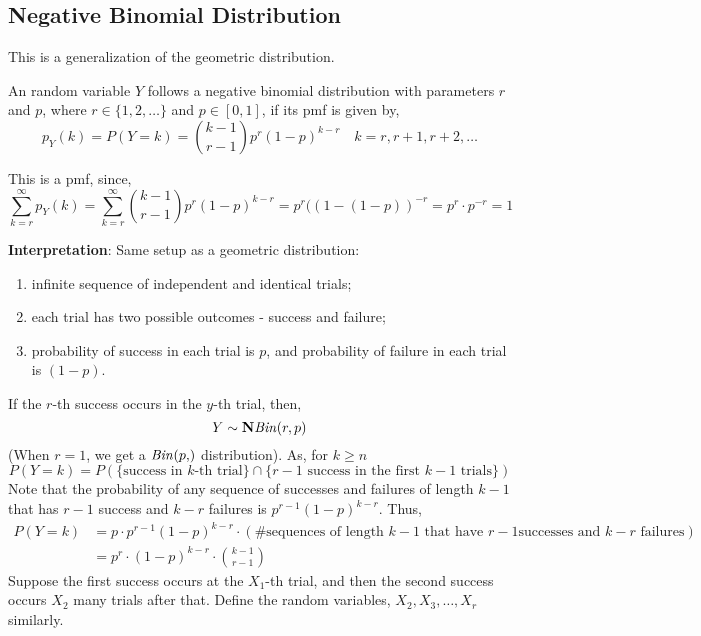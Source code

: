 \subsection{Negative Binomial Distribution}
This is a generalization of the geometric distribution. 
\begin{definition}
    An random variable $Y$ follows a negative binomial distribution with
parameters $r$ and $p$, where $r \in \lbrace 1, 2, \dots \rbrace$ and $p
\in [0, 1]$, if its pmf is given by, 
\[ p_Y(k) = P(Y = k) = {{k - 1} \choose {r - 1}} p^r (1 - p)^{k - r}
   \quad k = r, r+1, r+2, \dots                                              \]
\end{definition}
This is a pmf, since, 
\[   \sum_{k = r}^\infty p_Y(k) 
   = \sum_{k = r}^\infty {{k - 1} \choose {r - 1}} p^r (1 - p)^{k - r}  
   = p^r ((1 - (1 - p))^{-r}
   = p^r \cdot p^{-r}
   = 1                                                                       \]

\noindent
\textbf{Interpretation}: Same setup as a geometric distribution:
\begin{enumerate}[noitemsep, topsep=0em]
    \item infinite sequence of independent and identical trials;
    \item each trial has two possible outcomes - success and failure;
    \item probability of success in each trial is $p$, and probability of
          failure in each trial is $(1 - p)$. 
\end{enumerate}
If the $r$-th success occurs in the $y$-th trial, then,
\[ Y \sim \text{$\mathbf{N}$\emph{Bin}}(r, p) \]
(When $r = 1$, we get a $\binomialdist{p}$ distribution). As, for $k \geq n$
\[
    P(Y = k) = P(\lbrace \text{success in $k$-th trial} \rbrace \cap
                 \lbrace \text{$r-1$ success in the first $k-1$ trials}\rbrace)
\]
Note that the probability of any sequence of successes and failures of length
$k - 1$ that has $r - 1$ success and $k - r$ failures is $p^{r - 1}(1 - p)^{k -
r}$. Thus,
\begin{align*}
    P(Y = k) &= p \cdot p^{r - 1}(1 - p)^{k - r} \cdot
                (\# \text{sequences of length $k - 1$ that have $r - 1$
                successes and $k - r$ failures})                             \\
             &= p^r \cdot (1 - p)^{k - r} \cdot {{k - 1} \choose {r - 1}}  
\end{align*}
Suppose the first success occurs at the $X_1$-th trial, and then the second
success occurs $X_2$ many trials after that. Define the random  variables,
$X_2, X_3, \dots, X_r$ similarly. 
\begin{figure*}[!htp]
    \centering
    \def\svgwidth{\textwidth}
    
\end{figure*}

